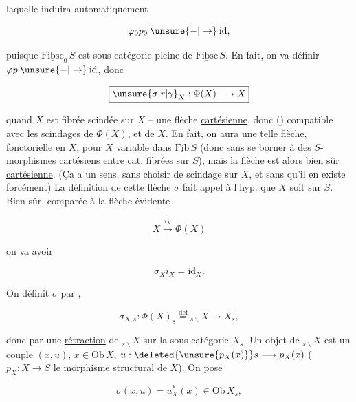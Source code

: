 laquelle induira automatiquement

\[
 \varphi_0p_0\mathbin{\unsure{-|\to}}\mathrm{id},
\]

puisque $\underline{\mathrm{Fibsc}}_0\,S$ est sous-catégorie pleine de $\underline{\mathrm{Fibsc}}\,S$. En fait, on va définir $\varphi p\mathbin{\unsure{-|\to}}\mathrm{id}$, donc

\[
 \boxed{\unsure{\sigma|r|\gamma}_X:\Phi(X)\longrightarrow X}
\]

quand $X$ est fibrée scindée sur $X$ -- une flèche \uline{cartésienne}, donc () compatible avec les scindages de $\Phi(X)$, et de $X$. En fait, on aura une telle  flèche, fonctorielle en $X$, pour $X$ variable dans $\underline{\mathrm{Fib}}\,S$ (donc sans se borner à des $S$-morphismes cartésiens entre cat. fibrées sur $S$), mais la flèche est alors bien sûr \uline{cartésienne}. (Ça a un sens, sans choisir de scindage sur $X$, et sans qu'il en existe forcément) La définition de cette flèche $\sigma$ fait appel   à l'hyp. que $X$ soit   sur $S$. Bien sûr, comparée à la flèche  évidente

\[
 X\xrightarrow{i_X}\Phi(X)
\]

on va avoir

\[
 \sigma_Xi_X=\mathrm{id}_X.
\]

\margin{[NB. Comme \inserted{on sait que} $i_X\in W$, il en résultera bien $\sigma_X\in W$ comme on le veut)}

On définit $\sigma$  par ,

\[
 \sigma_{X,s}:\Phi(X)_s\overset{\mathrm{def}}{=}{}_{s\backslash}X\longrightarrow X_s,
\]

donc par une \uline{rétraction} de $ {}_{s\backslash}X$ sur la sous-catégorie  $X_s$. Un objet de $ {}_{s\backslash}X$ est un couple $(x,u)$, $x\in\mathrm{Ob}\,X$, $u:\deleted{\unsure{p_X(x)}}s\longrightarrow p_X(x)$ ($p_X:X\longrightarrow S$ le morphisme structural de $X$). On pose

\[
 \sigma(x,u)=u^*_X(x)\in\mathrm{Ob}\,X_s,
\]

